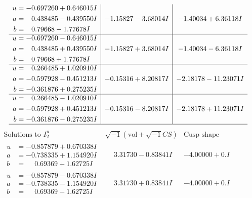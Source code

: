 \documentclass[1p]{elsarticle_modified}
\theoremstyle{definition}
\newcommand{\I}{\sqrt{-1}}
\begin{document}
$$\begin{array}{c|c|c}
\begin{aligned}
u &= -0.697260 + 0.646015 I \\
a &= \phantom{-}0.438485 - 0.439550 I \\
b &= \phantom{-}0.79668 - 1.77678 I\end{aligned}
 & -1.15827 - 3.68014 I & -1.40034 + 6.36118 I \\ \hline\begin{aligned}
u &= -0.697260 - 0.646015 I \\
a &= \phantom{-}0.438485 + 0.439550 I \\
b &= \phantom{-}0.79668 + 1.77678 I\end{aligned}
 & -1.15827 + 3.68014 I & -1.40034 - 6.36118 I \\ \hline\begin{aligned}
u &= \phantom{-}0.266485 + 1.020910 I \\
a &= -0.597928 - 0.451213 I \\
b &= -0.361876 + 0.275235 I\end{aligned}
 & -0.15316 + 8.20817 I & -2.18178 - 11.23071 I \\ \hline\begin{aligned}
u &= \phantom{-}0.266485 - 1.020910 I \\
a &= -0.597928 + 0.451213 I \\
b &= -0.361876 - 0.275235 I\end{aligned}
 & -0.15316 - 8.20817 I & -2.18178 + 11.23071 I\\
 \hline 
 \end{array}$$\newpage$$\begin{array}{c|c|c}  
\text{Solutions to }I^u_{2}& \I (\text{vol} + \sqrt{-1}CS) & \text{Cusp shape}\\
 \hline 
\begin{aligned}
u &= -0.857879 + 0.670338 I \\
a &= -0.738335 + 1.154920 I \\
b &= \phantom{-}0.69369 + 1.62725 I\end{aligned}
 & \phantom{-}3.31730 - 0.83841 I & -4.00000 + 0. I\phantom{ +0.000000I} \\ \hline\begin{aligned}
u &= -0.857879 - 0.670338 I \\
a &= -0.738335 - 1.154920 I \\
b &= \phantom{-}0.69369 - 1.62725 I\end{aligned}
 & \phantom{-}3.31730 + 0.83841 I & -4.00000 + 0. I\phantom{ +0.000000I} \\ \hline\begin{aligned}

\end{aligned}
\end{array}$$
\end{document}
